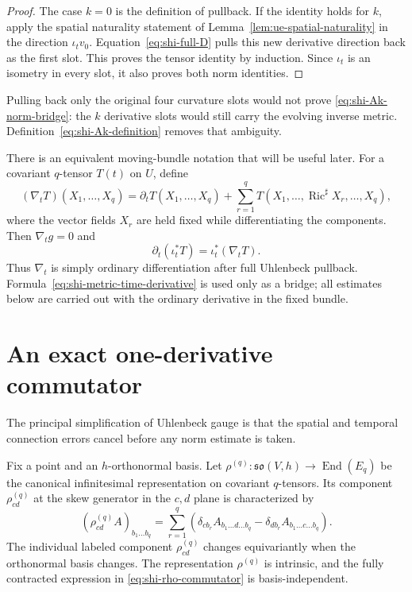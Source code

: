 \documentclass[10pt]{coll-l}
\theoremstyle{definition}
\theoremstyle{remark}
\numberwithin{section}{chapter}
\numberwithin{equation}{chapter}
\newcommand{\Ric}{\operatorname{Ric}}
\begin{document}
\begin{proof}
The case $k=0$ is the definition of pullback.  If the identity holds for
$k$, apply the spatial naturality statement of
Lemma~\ref{lem:ue-spatial-naturality} in the direction $\iota_t v_0$.
Equation~\eqref{eq:shi-full-D} pulls this new derivative direction back as
the first slot.  This proves the tensor identity by induction.  Since
$\iota_t$ is an isometry in every slot, it also proves both norm identities.
\end{proof}

Pulling back only the original four curvature slots would not prove
\eqref{eq:shi-Ak-norm-bridge}: the $k$ derivative slots would still carry
the evolving inverse metric.  Definition~\eqref{eq:shi-Ak-definition}
removes that ambiguity.

There is an equivalent moving-bundle notation that will be useful later.
For a covariant $q$-tensor $T(t)$ on $U$, define
\begin{equation}
 (\nabla_tT)(X_1,\ldots,X_q)
   =\partial_tT(X_1,\ldots,X_q)
      +\sum_{r=1}^q
       T(X_1,\ldots,\Ric^\sharp X_r,\ldots,X_q),         \label{eq:shi-metric-time-derivative}
\end{equation}
where the vector fields $X_r$ are held fixed while differentiating the
components.  Then $\nabla_tg=0$ and
\begin{equation}
       \partial_t(\iota_t^*T)=\iota_t^*(\nabla_tT).       \label{eq:shi-time-pullback-bridge}
\end{equation}
Thus $\nabla_t$ is simply ordinary differentiation after full Uhlenbeck
pullback.  Formula~\eqref{eq:shi-metric-time-derivative} is used only as a
bridge; all estimates below are carried out with the ordinary derivative in
the fixed bundle.

\section{An exact one-derivative commutator}
\label{sec:shi-exact-commutator}

The principal simplification of Uhlenbeck gauge is that the spatial and
temporal connection errors cancel before any norm estimate is taken.

Fix a point and an $h$-orthonormal basis.  Let
$\rho^{(q)}:\mathfrak{so}(V,h)\to\operatorname{End}(E_q)$ be the canonical
infinitesimal representation on covariant $q$-tensors.  Its component
$\rho_{cd}^{(q)}$ at the skew generator in the $c,d$ plane is characterized
by
\begin{equation}
 (\rho_{cd}^{(q)}A)_{b_1\ldots b_q}
  =\sum_{r=1}^q
    \left(
      \delta_{c b_r}A_{b_1\ldots d\ldots b_q}
      -\delta_{d b_r}A_{b_1\ldots c\ldots b_q}
    \right).                                             \label{eq:shi-rho-action}
\end{equation}
The individual labeled component $\rho_{cd}^{(q)}$ changes equivariantly
when the orthonormal basis changes.  The representation $\rho^{(q)}$ is
intrinsic, and the fully contracted expression in
\eqref{eq:shi-rho-commutator} is basis-independent.
\end{document}
